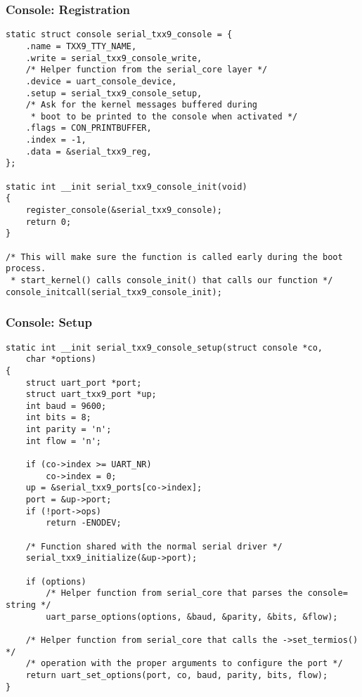 \begin{frame}[fragile]
  \frametitle{Console: Registration}
\begin{verbatim}
static struct console serial_txx9_console = {
    .name = TXX9_TTY_NAME,
    .write = serial_txx9_console_write,
    /* Helper function from the serial_core layer */
    .device = uart_console_device,
    .setup = serial_txx9_console_setup,
    /* Ask for the kernel messages buffered during
     * boot to be printed to the console when activated */
    .flags = CON_PRINTBUFFER,
    .index = -1,
    .data = &serial_txx9_reg,
};

static int __init serial_txx9_console_init(void)
{
    register_console(&serial_txx9_console);
    return 0;
}

/* This will make sure the function is called early during the boot process.
 * start_kernel() calls console_init() that calls our function */
console_initcall(serial_txx9_console_init);
\end{verbatim}
\end{frame}

\begin{frame}[fragile]
  \frametitle{Console: Setup}
\begin{verbatim}
static int __init serial_txx9_console_setup(struct console *co,
    char *options)
{
    struct uart_port *port;
    struct uart_txx9_port *up;
    int baud = 9600;
    int bits = 8;
    int parity = 'n';
    int flow = 'n';

    if (co->index >= UART_NR)
        co->index = 0;
    up = &serial_txx9_ports[co->index];
    port = &up->port;
    if (!port->ops)
        return -ENODEV;

    /* Function shared with the normal serial driver */
    serial_txx9_initialize(&up->port);

    if (options)
        /* Helper function from serial_core that parses the console= string */
        uart_parse_options(options, &baud, &parity, &bits, &flow);

    /* Helper function from serial_core that calls the ->set_termios() */
    /* operation with the proper arguments to configure the port */
    return uart_set_options(port, co, baud, parity, bits, flow);
}
\end{verbatim}
\end{frame}

